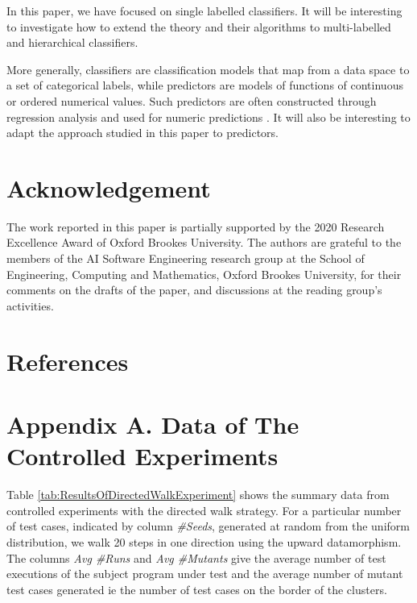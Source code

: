 \documentclass[preprint,1p,authoryear,times]{elsarticle}
\begin{document}
In this paper, we have focused on single labelled classifiers. It will be interesting to investigate how to extend the theory and their algorithms to multi-labelled and hierarchical classifiers. 

More generally, classifiers are classification models that map from a data space to a set of categorical labels, while predictors are models of functions of continuous or ordered numerical values. Such predictors are often constructed through regression analysis and used for numeric predictions \citep{DataMiningTextBook}. It will also be interesting to adapt the approach studied in this paper to predictors. 

\section*{Acknowledgement}

The work reported in this paper is partially supported by the 2020 Research Excellence Award of Oxford Brookes University. The authors are grateful to the members of the AI Software Engineering research group at the School of Engineering, Computing and Mathematics, Oxford Brookes University, for their comments on the drafts of the paper, and discussions at the reading group's activities. 

\section*{References}

%



\newpage
\section*{Appendix A. Data of The Controlled Experiments}

Table \ref{tab:ResultsOfDirectedWalkExperiment} shows the summary data from controlled experiments with the directed walk strategy. For a particular number of test cases, indicated by column \emph{\#Seeds}, generated at random from the uniform distribution, we walk 20 steps in one direction using the upward datamorphism. The columns \emph{Avg \#Runs} and \emph{Avg \#Mutants} give the average number of test executions of the subject program under test and the average number of mutant test cases generated ie the number of test cases on the border of the clusters.
\end{document}
